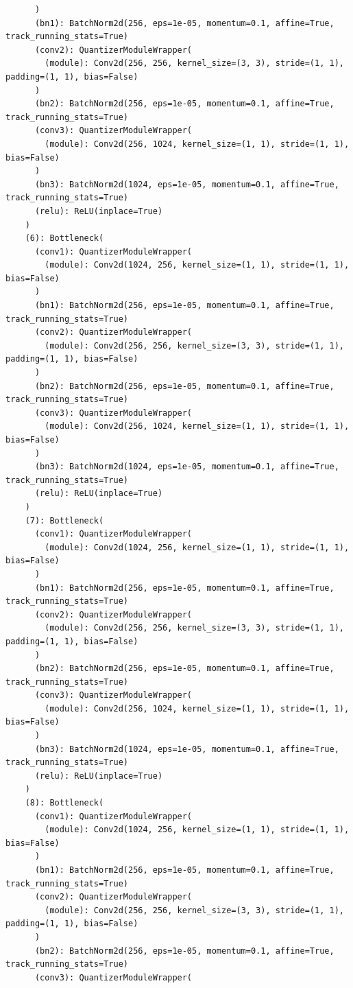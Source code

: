 \documentclass{article}
\begin{document}
\begin{verbatim}
      )
      (bn1): BatchNorm2d(256, eps=1e-05, momentum=0.1, affine=True, track_running_stats=True)
      (conv2): QuantizerModuleWrapper(
        (module): Conv2d(256, 256, kernel_size=(3, 3), stride=(1, 1), padding=(1, 1), bias=False)
      )
      (bn2): BatchNorm2d(256, eps=1e-05, momentum=0.1, affine=True, track_running_stats=True)
      (conv3): QuantizerModuleWrapper(
        (module): Conv2d(256, 1024, kernel_size=(1, 1), stride=(1, 1), bias=False)
      )
      (bn3): BatchNorm2d(1024, eps=1e-05, momentum=0.1, affine=True, track_running_stats=True)
      (relu): ReLU(inplace=True)
    )
    (6): Bottleneck(
      (conv1): QuantizerModuleWrapper(
        (module): Conv2d(1024, 256, kernel_size=(1, 1), stride=(1, 1), bias=False)
      )
      (bn1): BatchNorm2d(256, eps=1e-05, momentum=0.1, affine=True, track_running_stats=True)
      (conv2): QuantizerModuleWrapper(
        (module): Conv2d(256, 256, kernel_size=(3, 3), stride=(1, 1), padding=(1, 1), bias=False)
      )
      (bn2): BatchNorm2d(256, eps=1e-05, momentum=0.1, affine=True, track_running_stats=True)
      (conv3): QuantizerModuleWrapper(
        (module): Conv2d(256, 1024, kernel_size=(1, 1), stride=(1, 1), bias=False)
      )
      (bn3): BatchNorm2d(1024, eps=1e-05, momentum=0.1, affine=True, track_running_stats=True)
      (relu): ReLU(inplace=True)
    )
    (7): Bottleneck(
      (conv1): QuantizerModuleWrapper(
        (module): Conv2d(1024, 256, kernel_size=(1, 1), stride=(1, 1), bias=False)
      )
      (bn1): BatchNorm2d(256, eps=1e-05, momentum=0.1, affine=True, track_running_stats=True)
      (conv2): QuantizerModuleWrapper(
        (module): Conv2d(256, 256, kernel_size=(3, 3), stride=(1, 1), padding=(1, 1), bias=False)
      )
      (bn2): BatchNorm2d(256, eps=1e-05, momentum=0.1, affine=True, track_running_stats=True)
      (conv3): QuantizerModuleWrapper(
        (module): Conv2d(256, 1024, kernel_size=(1, 1), stride=(1, 1), bias=False)
      )
      (bn3): BatchNorm2d(1024, eps=1e-05, momentum=0.1, affine=True, track_running_stats=True)
      (relu): ReLU(inplace=True)
    )
    (8): Bottleneck(
      (conv1): QuantizerModuleWrapper(
        (module): Conv2d(1024, 256, kernel_size=(1, 1), stride=(1, 1), bias=False)
      )
      (bn1): BatchNorm2d(256, eps=1e-05, momentum=0.1, affine=True, track_running_stats=True)
      (conv2): QuantizerModuleWrapper(
        (module): Conv2d(256, 256, kernel_size=(3, 3), stride=(1, 1), padding=(1, 1), bias=False)
      )
      (bn2): BatchNorm2d(256, eps=1e-05, momentum=0.1, affine=True, track_running_stats=True)
      (conv3): QuantizerModuleWrapper(

\end{verbatim}
\end{document}
